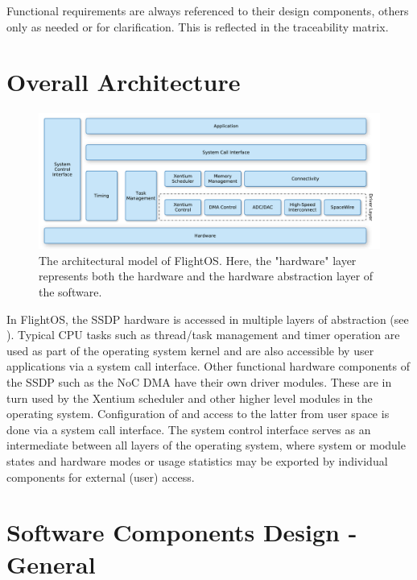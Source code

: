 \noindent
Functional requirements are always referenced to their design components, others
only as needed or for clarification. This is reflected in the traceability
matrix.



\section{Overall Architecture}


\begin{figure}[htb]
\begin{center}
	\includegraphics[width=\columnwidth]{../requirements/images/OS_logical}
	\caption{The architectural model of FlightOS. Here, the "hardware" layer
	represents both the hardware and the hardware abstraction layer of
	the software.}
	\label{fig:logical_model}
\end{center}
\end{figure}


In FlightOS, the \gls{SSDP} hardware is accessed in multiple layers of
abstraction (see ). Typical \gls{CPU} tasks such as
thread/task management and timer operation are used as part of the operating
system kernel and are also accessible by user applications via a system call
interface. Other functional hardware components of the \gls{SSDP} such as the
\gls{NoC} \gls{DMA} have their own driver modules. These are in turn used by the
\gls{Xentium} scheduler and other higher level modules in the operating system.
Configuration of and access to the latter from user space is done via a system
call interface. The system control interface serves as an intermediate between
all layers of the operating system, where system or module states and hardware
modes or usage statistics may be exported by individual components for external
(user) access.




\section{Software Components Design - General}


